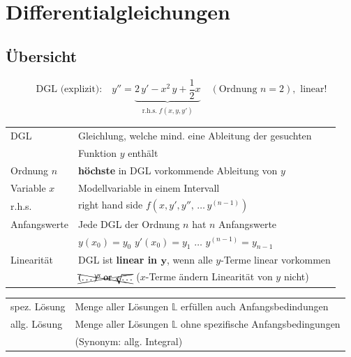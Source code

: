 \section{Differentialgleichungen}

\subsection{Übersicht}

\vspace{-0.2cm}

$$ \text{DGL (explizit):} \quad y'' = \underbrace{2 \, y' - x^2 \, y + \frac{1}{2}x}_{\substack{\text{r.h.s.} \; f(x, y, y')}}
    \quad (\text{Ordnung } n = 2), \text{ linear!} $$

\begin{tabular}{ll}
    DGL             & Gleichlung, welche mind. eine Ableitung der gesuchten                             \\
    \smallskip
                    & Funktion $y$ enthält                                                               \\
    \smallskip
    Ordnung $n$     & \textbf{höchste} in DGL vorkommende Ableitung von $y$                             \\
    \smallskip
    Variable $x$    & Modellvariable in einem Intervall                                                  \\
    \smallskip
    r.h.s.          & right hand side \quad $f(x, y', y'', \, \ldots \, y^{(n-1)} )$                    \\
    \smallskip
    Anfangswerte    & Jede DGL der Ordnung $n$ hat $n$ Anfangswerte                                     \\
    \smallskip
                    & $y(x_0) = y_0$ \quad $y'(x_0) = y_1$  \quad $\ldots$ \quad  $y^{(n-1)} = y_{n-1}$ \\
    Linearität      & DGL ist \textbf{linear in $\bm{y}$}, wenn alle $y$-Terme linear vorkommen         \\
                    & $\xcancel{(\dots)^n \text{ or } \sqrt[n]{\dots}}$ \qquad ($x$-Terme ändern Linearität von $y$ nicht) 
\end{tabular}

\medskip

\begin{tabular}{ll}
    \smallskip
    spez. Lösung    & Menge aller Lösungen   $\mathbb{L}$ erfüllen auch Anfangsbedindungen  \\
    allg. Lösung    & Menge aller Lösungen $\mathbb{L}$ ohne spezifische Anfangsbedingungen \\	
                    & (Synonym: allg. Integral) 
\end{tabular}


